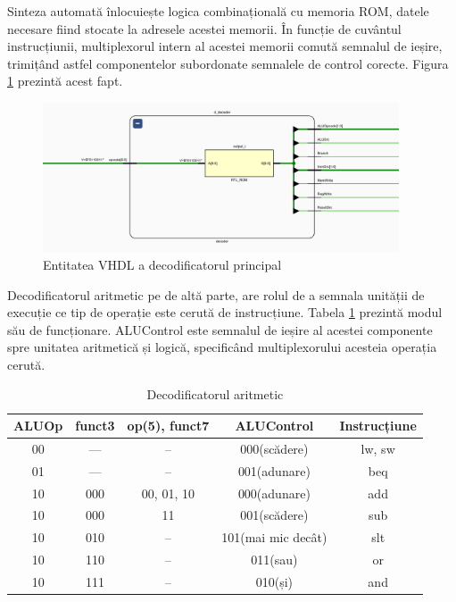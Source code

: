 \documentclass[12pt]{article}
\begin{document}
 
 Sinteza automată înlocuiește logica combinațională cu memoria ROM, datele necesare fiind stocate la adresele acestei memorii. În funcție de cuvântul instrucțiunii, multiplexorul intern al acestei memorii comută semnalul de ieșire, trimițând astfel componentelor subordonate semnalele de control corecte. Figura \ref{Figura:45} prezintă acest fapt.
 
  \begin{figure}[h!]
 \includegraphics[width=0.94\textwidth]{decoder.png}
 \centering
 \caption{Entitatea VHDL a decodificatorul principal}
 \label{Figura:45}
 \end{figure}

Decodificatorul aritmetic pe de altă parte, are rolul de a semnala unității de execuție ce tip de operație este cerută de instrucțiune. Tabela \ref{Tabela:17} prezintă modul său de funcționare. ALUControl este semnalul de ieșire al acestei componente spre unitatea aritmetică și logică, specificând multiplexorului acesteia operația cerută.

\newpage
 \begin{table}[h]
\centering
\begin{tabular}{ ||c|c|c|c|c|| }
 \hline
 ALUOp & funct3 & {op(5), funct7} & ALUControl & Instrucțiune\\ 
 \hline
 00 & --- & -- & 000(scădere) & lw, sw\\
 \hline
 01 & --- & -- & 001(adunare) & beq\\
 \hline
 10 & 000 & 00, 01, 10 & 000(adunare) & add\\
 \hline
 10 & 000 & 11 & 001(scădere) & sub\\
 \hline
 10 & 010 & -- & 101(mai mic decât) & slt\\
 \hline
 10 & 110 & -- & 011(sau) & or\\ 
\hline
 10 & 111 & -- & 010(și) & and\\
 \hline
\end{tabular}
\caption{Decodificatorul aritmetic}
\label{Tabela:17}
\end{table}
\end{document}
